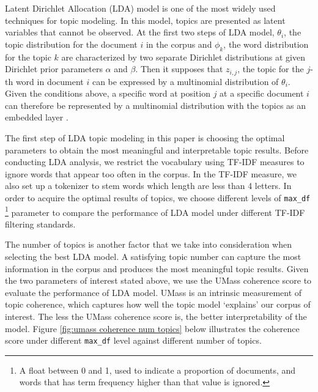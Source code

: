 \documentclass[final,authoryear,3p,12pt,times,hidelinks]{elsarticle}
\begin{document}
Latent Dirichlet Allocation (LDA) model is one of the most widely used techniques for topic modeling. In this model, topics are presented as latent variables that cannot be observed. At the first two steps of LDA model, $\theta_i$, the topic distribution for the document $i$ in the corpus and $\phi_k$, the word distribution for the topic $k$ are characterized by two separate Dirichlet distributions at given Dirichlet prior parameters $\alpha$ and $\beta$. Then it supposes that $z_{i,j}$, the topic for the $j$-th word in document $i$ can be expressed by a multinomial distribution of $\theta_i$. Given the conditions above, a specific word at position $j$ at a specific document $i$ can therefore be represented by a multinomial distribution with the topics as an embedded layer \citep{blei2003latent}.  

The first step of LDA topic modeling in this paper is choosing the optimal parameters to obtain the most meaningful and interpretable topic results. Before conducting LDA analysis, we restrict the vocabulary using TF-IDF measures to ignore words that appear too often in the corpus. In the TF-IDF measure, we also set up a tokenizer to stem words which length are less than 4 letters. In order to acquire the optimal results of topics, we choose different levels of \texttt{max\_df} \footnote{A float between 0 and 1, used to indicate a proportion of documents, and words that has term frequency higher than that value is ignored. } parameter to compare the performance of LDA model under different TF-IDF filtering standards. 

The number of topics is another factor that we take into consideration when selecting the best LDA model. A satisfying topic number can capture the most information in the corpus and produces the most meaningful topic results. Given the two parameters of interest stated above, we use the UMass coherence score to evaluate the performance of LDA model. UMass is an intrinsic measurement of topic coherence, which captures how well the topic model `explains' our corpus of interest. The less the UMass coherence score is, the better interpretability of the model. Figure \ref{fig:umass coherence num topics} below illustrates the coherence score under different \texttt{max\_df} level against different number of topics.
\end{document}
